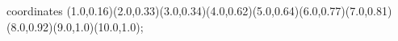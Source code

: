 					coordinates { (1.0,0.16)(2.0,0.33)(3.0,0.34)(4.0,0.62)(5.0,0.64)(6.0,0.77)(7.0,0.81)(8.0,0.92)(9.0,1.0)(10.0,1.0)};
